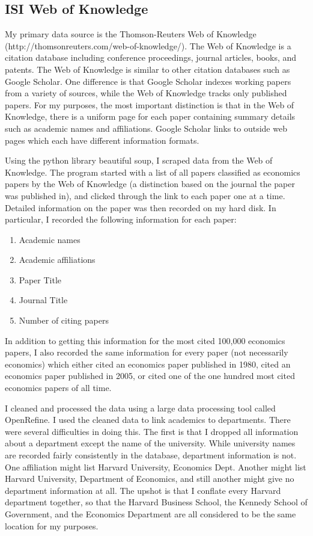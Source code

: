 \subsection{ISI Web of Knowledge}

My primary data source is the Thomson-Reuters Web of Knowledge
(http://thomsonreuters.com/web-of-knowledge/). The Web of Knowledge is a
citation database including conference proceedings, journal articles,
books, and patents. The Web of Knowledge is similar to other citation
databases such as Google Scholar. One difference is that Google Scholar
indexes working papers from a variety of sources, while the Web of
Knowledge tracks only published papers. For my purposes, the most
important distinction is that in the Web of Knowledge, there is a
uniform page for each paper containing summary details such as academic
names and affiliations. Google Scholar links to outside web pages which
each have different information formats.

Using the python library beautiful soup, I scraped data from the Web of
Knowledge. The program started with a list of all papers classified as
economics papers by the Web of Knowledge (a distinction based on the
journal the paper was published in), and clicked through the link to
each paper one at a time. Detailed information on the paper was then
recorded on my hard disk. In particular, I recorded the following
information for each paper:

\begin{enumerate}
\def\labelenumi{\arabic{enumi}.}
\itemsep1pt\parskip0pt
\item
  Academic names
\item
  Academic affiliations
\item
  Paper Title
\item
  Journal Title
\item
  Number of citing papers
\end{enumerate}

In addition to getting this information for the most cited 100,000
economics papers, I also recorded the same information for every paper
(not necessarily economics) which either cited an economics paper
published in 1980, cited an economics paper published in 2005, or cited
one of the one hundred most cited economics papers of all time.

I cleaned and processed the data using a large data processing tool
called OpenRefine. I used the cleaned data to link academics to
departments. There were several difficulties in doing this. The first is
that I dropped all information about a department except the name of the
university. While university names are recorded fairly consistently in
the database, department information is not. One affiliation might list
Harvard University, Economics Dept. Another might list Harvard
University, Department of Economics, and still another might give no
department information at all. The upshot is that I conflate every
Harvard department together, so that the Harvard Business School, the
Kennedy School of Government, and the Economics Department are all
considered to be the same location for my purposes.

